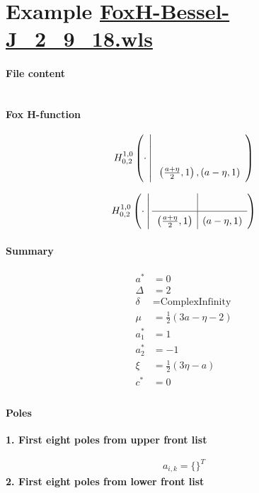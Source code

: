 \documentclass[11pt]{article}
\begin{document}
\section{Example \url{FoxH-Bessel-J_2_9_18.wls}}

\paragraph{File content}

\inputminted{text}{FoxH-Bessel-J_2_9_18.wls}

\paragraph{Fox H-function}

\begin{align*}
  \FoxH
    {1,0}
    {0,2}
    {\cdot}
    {}
    {\left(\frac{a+\eta }{2}, 1\right), \left(a-\eta, 1\right)}
\end{align*}

\begin{align*}
  \FoxHext
    {1,0}
    {0,2}
    {\cdot}
    {}
    {}
    {\left(\frac{a+\eta }{2}, 1\right)}
    {\left(a-\eta, 1\right)}
\end{align*}

\paragraph{Summary}

\begin{align*}
  a^*    & = 0 \\
  \Delta & = 2 \\
  \delta & = \text{ComplexInfinity} \\
  \mu    & = \frac{1}{2} (3 a-\eta -2) \\
  a_1^*  & = 1 \\
  a_2^*  & = -1 \\
  \xi    & = \frac{1}{2} (3 \eta -a) \\
  c^*    & = 0 \\
\end{align*}

\paragraph{Poles}

\noindent\textbf{1. First eight poles from upper front list}

\begin{align*}
  a_{i,k} = 
  \{\}^T 
\end{align*}
\noindent\textbf{2. First eight poles from lower front list}
\end{document}
